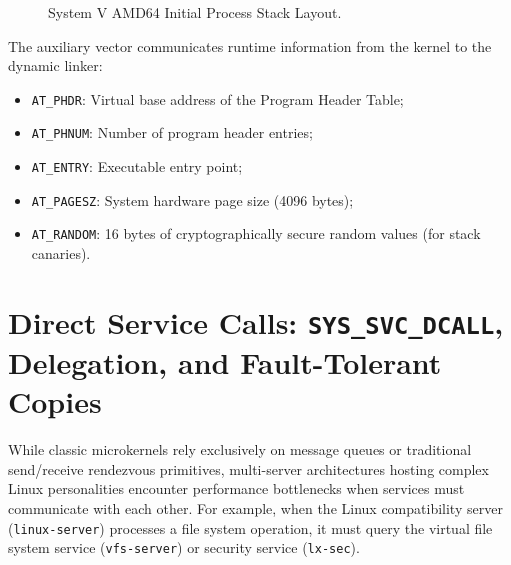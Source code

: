 \begin{figure}[htbp]
\centering
{}
\caption{System V AMD64 Initial Process Stack Layout.}
\label{fig:user_stack_layout}
\end{figure}

The auxiliary vector communicates runtime information from the kernel to the dynamic linker:
\begin{itemize}
    \item \texttt{AT\_PHDR}: Virtual base address of the Program Header Table;
    \item \texttt{AT\_PHNUM}: Number of program header entries;
    \item \texttt{AT\_ENTRY}: Executable entry point;
    \item \texttt{AT\_PAGESZ}: System hardware page size (4096 bytes);
    \item \texttt{AT\_RANDOM}: 16 bytes of cryptographically secure random values (for stack canaries).
\end{itemize}

\section{Direct Service Calls: \texttt{SYS\_SVC\_DCALL}, Delegation, and Fault-Tolerant Copies}
\label{sec:direct_service_calls}

While classic microkernels rely exclusively on message queues or traditional send/receive rendezvous primitives, multi-server architectures hosting complex Linux personalities encounter performance bottlenecks when services must communicate with each other. For example, when the Linux compatibility server (\texttt{linux-server}) processes a file system operation, it must query the virtual file system service (\texttt{vfs-server}) or security service (\texttt{lx-sec}).

